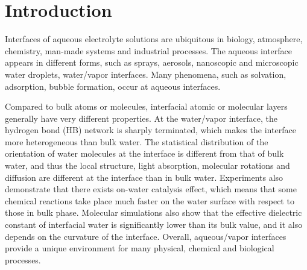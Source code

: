 \chapter{Introduction}\label{CHAPTER_1}
Interfaces of aqueous electrolyte solutions are ubiquitous in biology, atmosphere, chemistry, man-made systems 
and industrial processes\cite{Irwin88,Tobias1999, Benderskii00, 
Asahi2001,Benderskii02,Richmond2002,LiuH2004,
TianCS08,Yamamoto2008, Salmeron2009,ZhangLY2009,
LoNostro2012,Piatkowski2014,Balajka2018}.
The aqueous interface appears in different forms, such as sprays, aerosols, nanoscopic and  microscopic water droplets, water/vapor interfaces.
Many phenomena, such as solvation\cite{Benjamin1996}, adsorption\cite{Chang06}, bubble formation\cite{Craig1993,Craig1993b,Weissenborn1995,Marcelja04,Craig04},
occur at aqueous interfaces\cite{Ball2008,Kuo2004b}. 

Compared to bulk atoms or molecules, interfacial atomic or molecular layers generally have very different properties. 
At the water/vapor interface, the hydrogen bond (HB) network is sharply terminated, which makes the interface more heterogeneous 
than bulk water\cite{singh2013}. 
The statistical distribution of the orientation of water molecules at the interface is different from that of bulk water,
and thus the local structure, light absorption,  molecular rotations and diffusion are different at the interface than in bulk water\cite{Jedlovszky2004}.
Experiments also demonstrate that there exists on-water catalysis effect, which means that some chemical reactions take place much faster 
on the water surface with respect to those in bulk phase\cite{Rideout1980,Narayan2005,Beattie2010}.
Molecular simulations also show that the effective dielectric constant of interfacial water is significantly lower than its bulk value, 
and it also depends on the curvature of the interface\cite{Dinpajooh2016}. 
Overall, aqueous/vapor interfaces provide a unique environment for many physical, chemical and biological processes. 

